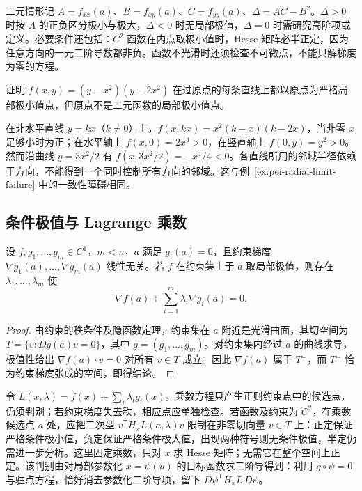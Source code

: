 二元情形记 $A=f_{xx}(a)$、$B=f_{xy}(a)$、$C=f_{yy}(a)$、$\Delta=AC-B^2$。$\Delta>0$ 时按 $A$ 的正负区分极小与极大，$\Delta<0$ 时无局部极值，$\Delta=0$ 时需研究高阶项或定义。必要条件还包括：$C^2$ 函数在内点取极小值时，Hesse 矩阵必半正定，因为任意方向的一元二阶导数都非负。函数不光滑时还须检查不可微点，不能只解梯度为零的方程。

\begin{example}
\label{ex:pei-linewise-minimum-failure}
证明 $f(x,y)=(y-x^2)(y-2x^2)$ 在过原点的每条直线上都以原点为严格局部极小值点，但原点不是二元函数的局部极小值点。
\end{example}
\begin{solve}
在非水平直线 $y=kx$（$k\ne0$）上，$f(x,kx)=x^2(k-x)(k-2x)$，当非零 $x$ 足够小时为正；在水平轴上 $f(x,0)=2x^4>0$，在竖直轴上 $f(0,y)=y^2>0$。然而沿曲线 $y=3x^2/2$ 有 $f(x,3x^2/2)=-x^4/4<0$。各直线所用的邻域半径依赖于方向，不能得到一个同时控制所有方向的邻域。这与例~\ref{ex:pei-radial-limit-failure} 中的一致性障碍相同。
\end{solve}

\subsection{条件极值与 Lagrange 乘数}

\begin{theorem}
\label{thm:pei-lagrange-multipliers}
设 $f,g_1,\ldots,g_m\in C^1$，$m<n$，$a$ 满足 $g_i(a)=0$，且约束梯度 $\nabla g_1(a),\ldots,\nabla g_m(a)$ 线性无关。若 $f$ 在约束集上于 $a$ 取局部极值，则存在 $\lambda_1,\ldots,\lambda_m$ 使
\[
\nabla f(a)+\sum_{i=1}^m\lambda_i\nabla g_i(a)=0.
\]
\end{theorem}
\begin{proof}
由约束的秩条件及隐函数定理，约束集在 $a$ 附近是光滑曲面，其切空间为 $T=\{v:Dg(a)v=0\}$，其中 $g=(g_1,\ldots,g_m)$。对约束集内经过 $a$ 的曲线求导，极值性给出 $\nabla f(a)\cdot v=0$ 对所有 $v\in T$ 成立。因此 $\nabla f(a)$ 属于 $T^\perp$，而 $T^\perp$ 恰为约束梯度张成的空间，即得结论。
\end{proof}

令 $L(x,\lambda)=f(x)+\sum_i\lambda_i g_i(x)$。乘数方程只产生正则约束点中的候选点，仍须判别；若约束梯度失去秩，相应点应单独检查。若函数及约束为 $C^2$，在乘数候选点 $a$ 处，应把二次型 $v^{\mathsf T}H_xL(a,\lambda)v$ 限制在非零切向量 $v\in T$ 上：正定保证严格条件极小值，负定保证严格条件极大值，出现两种符号则无条件极值，半定仍需进一步分析。这里固定乘数，只对 $x$ 求 Hesse 矩阵；无需它在整个空间上正定。该判别由对局部参数化 $x=\psi(u)$ 的目标函数求二阶导得到：利用 $g\circ\psi=0$ 与驻点方程，恰好消去参数化二阶导项，留下 $D\psi^{\mathsf T}H_xL\,D\psi$。

